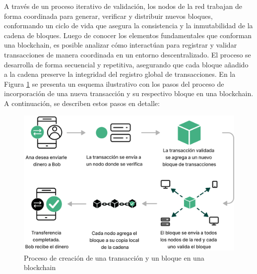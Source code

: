 A través de un proceso iterativo de validación, los nodos de la red trabajan de forma coordinada para generar, verificar y distribuir nuevos bloques, conformando un ciclo de vida que asegura la consistencia y la inmutabilidad de la cadena de bloques. Luego de conocer los elementos fundamentales que conforman una blockchain, es posible analizar cómo interactúan para registrar y validar transacciones de manera coordinada en un entorno descentralizado. El proceso se desarrolla de forma secuencial y repetitiva, asegurando que cada bloque añadido a la cadena preserve la integridad del registro global de transacciones. En la Figura \ref{fig:blockchain-working} se presenta un esquema ilustrativo con los pasos del proceso de incorporación de una nueva transacción y su respectivo bloque en una blockchain. A continuación, se describen estos pasos en detalle:

\begin{figure}[!tb]
    \centering
    \includegraphics[width=\textwidth]{Figures/block-creation.png}
    \caption{Proceso de creación de una transacción y un bloque en una blockchain}
    \label{fig:blockchain-working}
\end{figure}

